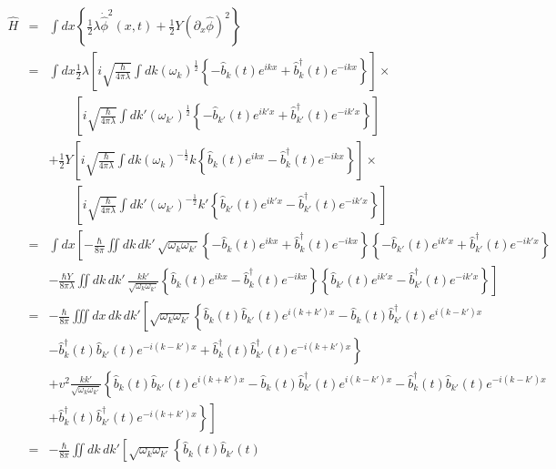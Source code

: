 \begin{eqnarray}
\hat{H} & = &\int dx\left\{ \frac{1}{2}\lambda\dot{\hat{\phi}}^{2}\left(
x,t\right) +\frac{1}{2}Y\left( \partial_{x}\hat{\phi}\right) ^{2}\right\} \\
& = &\int dx\frac{1}{2}\lambda\left[ i\sqrt{\frac{\hbar}{4\pi\lambda}}\int
dk\left( \omega
_k\right) ^{\frac{1}{2}}\left\{ -\hat{b}_k(t) e^{ikx}+\hat{b}_k^\dagger
(t) e^{-ikx}\right\} \right]\times\\
&&\qquad  \left[i\sqrt{\frac{\hbar}{4\pi\lambda}}\int dk'\left(
\omega_{k'}\right) ^{\frac{1}{2}}\left\{ -\hat{b}_{k'}(t)
e^{ik'x}+\hat{b}_{k'}^\dagger (t) e^{-ik'x}\right\} \right] \\
&&+\frac{1}{2}Y\left[ i\sqrt{\frac{\hbar}{4\pi\lambda}}\int dk\left(
\omega_k\right)^{-\frac{1}{2}}k\left\{
\hat{b}_k(t)e^{ikx}-\hat{b}_k^\dagger (t) e^{-ikx}\right\} \right]\times\\
&&\qquad \left[ i\sqrt{\frac{\hbar}{4\pi\lambda}}\int dk'\left(
\omega_{k'}\right) ^{-\frac{1}{2}}k'\left\{ \hat{b}_{k'}(t)
e^{ik'x}-\hat{b}_{k'}^\dagger (t) e^{-ik'x}\right\} \right] \\
& = &\int dx\left[-\frac{\hbar}{8\pi}\iint dk\,dk'\,
\sqrt{\omega_k\omega_{k'}}\left\{ -\hat{b}_k(t) e^{ikx}+\hat{b}_k^\dagger
(t) e^{-ikx}\right\} \left\{ -\hat{b}_{k'}(t) e^{ik'x}+\hat{b}_{k'}^\dagger (t)
e^{-ik'x}\right\}\right. \nonumber \\
&&\left.-\frac{\hbar Y}{8\pi\lambda}\iint dk\,dk'\,
\frac{kk'}{\sqrt{\omega_k\omega_{k'}}}\left\{ \hat{b}_k(t)
e^{ikx}-\hat{b}_k^\dagger (t) e^{-ikx}\right\} \left\{ \hat{b}_{k'}(t)
e^{ik'x}-\hat{b}_{k'}^\dagger (t) e^{-ik'x}\right\}\right]\\
& = &-\frac{\hbar}{8\pi}\iiint dx\, dk\, dk' \left[
\sqrt{\omega_k\omega_{k'}}\left\{\hat{b}_k(t) \hat{b}_{k'}(t)
e^{i(k+k')x}-\hat{b}_k(t) \hat{b}_{k'}^\dagger (t) e^{i(k-k') x}\right.\right.
\nonumber \\
&&\left.-\hat{b}_k^\dagger (t) \hat{b}_{k'}(t)
e^{-i(k-k')x}+\hat{b}_k^\dagger (t) \hat{b}_{k'}^\dagger
(t)e^{-i(k+k')x}\right\} \nonumber\\
&&+v^{2}\frac{kk'}{\sqrt{\omega_k\omega_{k'}}}\left\{\hat{b}_k(t)
\hat{b}_{k'}(t) e^{i(k+k')x}-\hat{b}_k(t) \hat{b}_{k'}^\dagger (t) e^{i(k-k')
x}-\hat{b}_k^\dagger (t) \hat{b}_{k'}(t) e^{-i(k-k') x}\right.\nonumber\\
&&\left.\left.+\hat{b}_k^\dagger (t) \hat{b}_{k'}^\dagger (t)
e^{-i(k+k')x}\right\}\right] \\
& = &-\frac{\hbar}{8\pi}\iint dk\, dk' \left[
\sqrt{\omega_k\omega_{k'}}\left\{\hat{b}_k(t) \hat{b}_{k'}(t)

\end{eqnarray}
